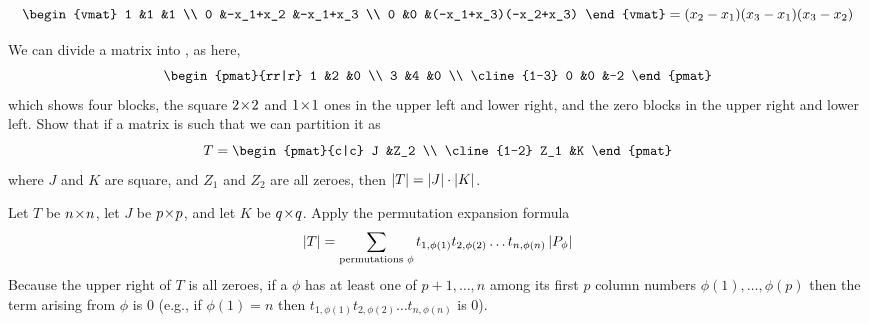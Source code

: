 \begin{exercises}
\begin{answer}
\begin{equation*}
\begin{vmat}
          1     &1             &1                     \\
          0     &-x_1+x_2      &-x_1+x_3              \\
          0     &0             &(-x_1+x_3)(-x_2+x_3) 
        \end{vmat}
        =(x_2-x_1)(x_3-x_1)(x_3-x_2)
      \end{equation*}
    \end{answer}
  \item 
    We can divide a matrix into  
    , %
    as here,
    \begin{equation*} 
      \begin{pmat}{rr|r}
          1  &2   &0  \\
          3  &4   &0  \\  \cline{1-3}
          0  &0   &-2 
       \end{pmat}
    \end{equation*}
    which shows four blocks, the square $2 \! \times \! 2$ and $1 \! \times \! 1$ ones
    in the upper left and lower right, and the zero blocks in the
    upper right and lower left.
    Show that if a matrix is such that we can partition it as
    \begin{equation*}
      T=
      \begin{pmat}{c|c}
          J   &Z_2  \\  \cline{1-2}
          Z_1 &K
       \end{pmat}
    \end{equation*}
    where $J$ and $K$ are square, and $Z_1$ and $Z_2$ are all zeroes,
    then \( \deter{T}=\deter{J}\cdot\deter{K} \).
    \begin{answer}
      Let \( T \) be \( n \! \times \! n \),
      let \( J \) be \( p \! \times \! p \),
      and let \( K \) be \( q \! \times \! q \).
      Apply the permutation expansion formula
      \begin{equation*}
        \deter{T}=
        \sum_{\text{\scriptsize permutations }\phi}
                t_{1,\phi(1)}t_{2,\phi(2)}\dots t_{n,\phi(n)}
                \deter{P_{\phi}}
      \end{equation*}
      Because the upper right of \( T \) is all zeroes, if a
      \( \phi \) has at least one of \( p+1,\dots,n \) among its first
      \( p \) column numbers \( \phi(1),\dots,\phi(p) \) then the term arising
      from \( \phi \) is \( 0 \)
      (e.g., if \( \phi(1)=n \) then
      \( t_{1,\phi(1)}t_{2,\phi(2)}\dots t_{n,\phi(n)} \)
      is \( 0 \)).

\end{answer}
\end{exercises}
